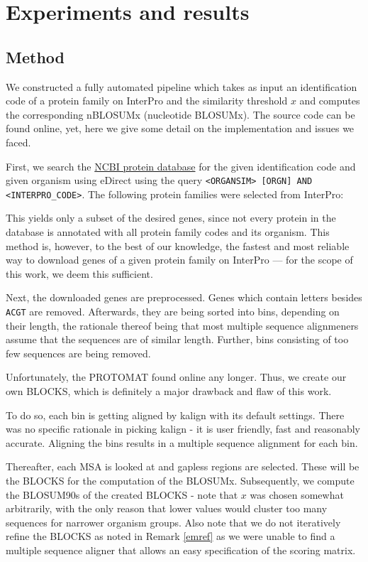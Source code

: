 \documentclass{article}
\begin{document}
\section*{Experiments and results}
\subsection*{Method}
We constructed a fully automated pipeline which takes as input an identification code of a protein
family on InterPro and the similarity threshold $x$ and computes the
corresponding nBLOSUMx (nucleotide BLOSUMx). The source code can be found online, yet, here we
give some detail on the implementation and issues we faced.

First, we search the \href{https://www.ncbi.nlm.nih.gov/protein}{NCBI protein
database} for the given identification code and given organism using eDirect
using the query \texttt{<ORGANSIM> [ORGN] AND <INTERPRO\_CODE>}.
The following protein families were selected from InterPro:
 
This yields only a subset of the desired genes, since not every
protein in the database is annotated with all protein family codes and its organism. This method is,
however, to the best of our knowledge, the fastest and most reliable way to
download genes of a given protein family on InterPro --- for the scope of this
work, we deem this sufficient.

Next, the downloaded genes are preprocessed. Genes which contain letters 
besides \texttt{ACGT} are removed. Afterwards, they are being sorted into bins,
depending on their length, the rationale thereof being that most multiple
sequence alignmeners assume that the sequences are of similar length. Further,
bins consisting of too few sequences are being removed.

Unfortunately, the PROTOMAT \cite{henikoffAutomatedAssemblyProtein1991} found online any longer. 
Thus, we create our own BLOCKS, which is definitely a major drawback and flaw of this work. 

To do so, each bin is getting aligned by kalign \cite{lassmannKalignAccurateFast2005} with
its default settings. There was no specific rationale in picking kalign - it is
user friendly, fast and reasonably accurate. Aligning the bins results
in a multiple sequence alignment for each bin.

Thereafter, each MSA is looked at and gapless regions are selected. 
These will be the BLOCKS for the computation of the BLOSUMx.
Subsequently, we compute the BLOSUM90s of the created BLOCKS - note that $x$
was chosen somewhat arbitrarily, with the only reason that lower values would
cluster too many sequences for narrower organism groups. Also note
that we do not iteratively refine the BLOCKS as noted in Remark \ref{emref}
as we were unable to find a multiple sequence aligner that allows an easy specification
of the scoring matrix.
\end{document}
